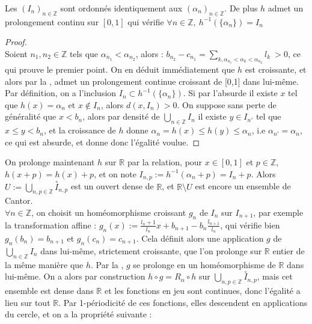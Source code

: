 \documentclass[11pt,a4paper]{article}
\begin{document}
\begin{lemma} 
Les $(I_n)_{n\in\mathbb{Z}}$ sont ordonnés identiquement aux $(\alpha_n)_{n\in\mathbb{Z}}$. De plus $h$ admet un prolongement continu sur $[0,1]$ qui vérifie $\forall n \in \mathbb{Z},\  h^{-1}(\{\alpha_n\})=I_n$
\end{lemma}


\begin{proof} \\
Soient $n_1,n_2 \in \mathbb{Z}$ tels que $\alpha_{n_1} < \alpha_{n_2}$, alors : $b_{n_2} - c_{n_1} = \displaystyle \sum_{k, \alpha_{n_1} < \alpha_k < \alpha_{n_2}} l_k \  > 0$, ce qui prouve le premier point. On en déduit immédiatement que $h$ est croissante, et alors par la , admet un prolongement continue croissant de [0,1] dans lui-même. \\
 Par définition, on a l'inclusion $I_n \subset h^{-1}(\{\alpha_n\})$. Si par l'absurde il existe $x$ tel que $h(x)=\alpha_n$ et $x \notin I_n$, alors $d(x,I_n) >0$. On suppose sans perte de généralité que $x<b_n$, alors par densité de $\displaystyle \bigcup_{n\in \mathbb{Z}} I_n$ il existe $y\in I_{n'}$ tel que $x\leq y < b_n$, et la croissance de $h$ donne $\alpha_n = h(x) \leq h(y) \leq \alpha_n$, i.e $\alpha_{n'} = \alpha_n$, ce qui est absurde, et donne donc l'égalité voulue. 
\end{proof}

On prolonge maintenant $h$ sur $\mathbb{R}$ par la relation, pour $x\in [0,1]$ et $p\in \mathbb{Z}$, $h(x+p)=h(x)+p$, et on note $I_{n,p}:=h^{-1}(\alpha_n+p)=I_n + p$. Alors $\displaystyle U:= \bigcup_{n,p \in \mathbb{Z}} \overset{\circ}I_{n,p}$ est un ouvert dense de $\mathbb{R}$, et $\mathbb{R}\setminus U$ est encore un ensemble de Cantor. \\

$\forall n \in \mathbb{Z}$, on choisit un homéomorphisme croissant $g_n$ de $I_n$ sur $I_{n+1}$, par exemple la transformation affine : $g_n(x) := \displaystyle \frac{l_n+1}{l_n}x + b_{n+1}-b_n\frac{l_{n+1}}{l_n}$, qui vérifie bien $g_n(b_n)=b_{n+1}$ et $g_n(c_n)=c_{n+1}$. Cela définit alors une application $g$ de $\displaystyle \bigcup_{n\in \mathbb{Z}} I_n$ dans lui-même, strictement croissante, que l'on prolonge sur $\mathbb{R}$ entier de la même manière que $h$. Par la , $g$ se prolonge en un homéomorphisme de $\mathbb{R}$ dans lui-même. On a alors par construction $h \circ g = R_\alpha \circ h$ sur $\displaystyle \bigcup_{n,p \in \mathbb{Z}} \overset{\circ}I_{n,p}$, mais cet ensemble est dense dans $\mathbb{R}$ et les fonctions en jeu sont continues, donc l'égalité a lieu sur tout $\mathbb{R}$. Par 1-périodicité de ces fonctions, elles descendent en applications du cercle, et on a la propriété suivante :
\end{document}
